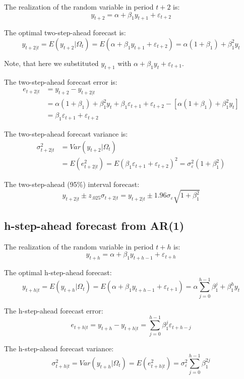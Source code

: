 \documentclass[
  12pt,
  oneside]{book}
\begin{document}
The realization of the random variable in period \(t+2\) is: \[y_{t+2} = \alpha + \beta_1 y_{t+1} + \varepsilon_{t+2}\]

The optimal two-step-ahead forecast is: \[y_{t+2|t} = E(y_{t+2}|\Omega_t) = E(\alpha + \beta_1 y_{t+1} + \varepsilon_{t+2}) = \alpha(1+\beta_1) + \beta_1^2 y_t\]

Note, that here we substituted \(y_{t+1}\) with \(\alpha + \beta_1 y_t + \varepsilon_{t+1}\).

The two-step-ahead forecast error is:
\[\begin{aligned}
e_{t+2|t} &= y_{t+2} - y_{t+2|t} \\
&= \alpha(1+\beta_1) + \beta_1^2 y_t + \beta_1\varepsilon_{t+1} + \varepsilon_{t+2} - [\alpha(1+\beta_1) + \beta_1^2 y_t] \\
&= \beta_1\varepsilon_{t+1} + \varepsilon_{t+2}
\end{aligned}\]

The two-step-ahead forecast variance is:
\[\begin{aligned}
\sigma_{t+2|t}^2 &= Var(y_{t+2}|\Omega_t) \\
&= E(e_{t+2|t}^2) = E(\beta_1\varepsilon_{t+1} + \varepsilon_{t+2})^2 = \sigma_{\varepsilon}^2(1+\beta_1^2)
\end{aligned}\]

The two-step-ahead (95\%) interval forecast: \[y_{t+2|t} \pm z_{.025}\sigma_{t+2|t} = y_{t+2|t} \pm 1.96\sigma_{\varepsilon}\sqrt{1+\beta_1^2}\]

\hypertarget{h-step-ahead-forecast-from-ar1}{%
\subsection{h-step-ahead forecast from AR(1)}\label{h-step-ahead-forecast-from-ar1}}

The realization of the random variable in period \(t+h\) is: \[y_{t+h} = \alpha + \beta_1 y_{t+h-1} + \varepsilon_{t+h}\]

The optimal h-step-ahead forecast: \[y_{t+h|t} = E(y_{t+h}|\Omega_t) = E(\alpha + \beta_1 y_{t+h-1} + \varepsilon_{t+1}) = \alpha\textstyle\sum_{j=0}^{h-1}\beta_1^j + \beta_1^h y_t\]

The h-step-ahead forecast error: \[e_{t+h|t} = y_{t+h} - y_{t+h|t} = \textstyle\sum_{j=0}^{h-1}\beta_1^j\varepsilon_{t+h-j}\]

The h-step-ahead forecast variance: \[\sigma_{t+h|t}^2 = Var(y_{t+h}|\Omega_t) = E(e_{t+h|t}^2) = \sigma_{\varepsilon}^2\textstyle\sum_{j=0}^{h-1}\beta_1^{2j}\]
\end{document}

